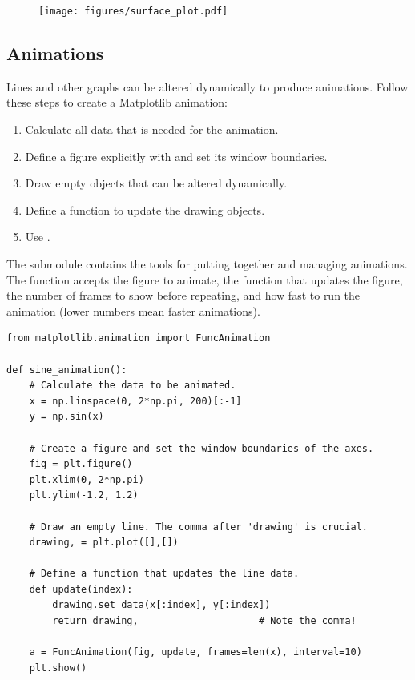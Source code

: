 \begin{figure}[H]
    \texttt{[image: figures/surface\_plot.pdf]}
\end{figure}

\subsection*{Animations} %

Lines and other graphs can be altered dynamically to produce animations.
Follow these steps to create a Matplotlib animation:
%
\begin{enumerate}
    \item Calculate all data that is needed for the animation.
    \item Define a figure explicitly with  and set its window boundaries.
    \item Draw empty objects that can be altered dynamically.
    \item Define a function to update the drawing objects.
    \item Use .
\end{enumerate}

The submodule  contains the tools for putting together and managing animations.
The function  accepts the figure to animate, the function that updates the figure, the number of frames to show before repeating, and how fast to run the animation (lower numbers mean faster animations).

\begin{lstlisting}
from matplotlib.animation import FuncAnimation

def sine_animation():
    # Calculate the data to be animated.
    x = np.linspace(0, 2*np.pi, 200)[:-1]
    y = np.sin(x)

    # Create a figure and set the window boundaries of the axes.
    fig = plt.figure()
    plt.xlim(0, 2*np.pi)
    plt.ylim(-1.2, 1.2)

    # Draw an empty line. The comma after 'drawing' is crucial.
    drawing, = plt.plot([],[])

    # Define a function that updates the line data.
    def update(index):
        drawing.set_data(x[:index], y[:index])
        return drawing,                     # Note the comma!

    a = FuncAnimation(fig, update, frames=len(x), interval=10)
    plt.show()
\end{lstlisting}

